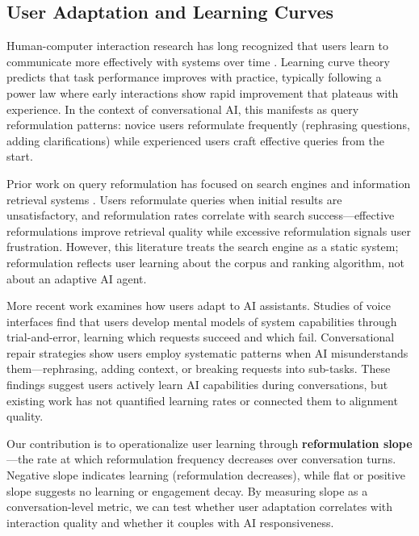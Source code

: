 \subsection{User Adaptation and Learning Curves}

Human-computer interaction research has long recognized that users learn to communicate more effectively with systems over time \cite{newell1981mechanisms}. Learning curve theory predicts that task performance improves with practice, typically following a power law where early interactions show rapid improvement that plateaus with experience. In the context of conversational AI, this manifests as query reformulation patterns: novice users reformulate frequently (rephrasing questions, adding clarifications) while experienced users craft effective queries from the start.

Prior work on query reformulation has focused on search engines and information retrieval systems \cite{huang2009query}. Users reformulate queries when initial results are unsatisfactory, and reformulation rates correlate with search success---effective reformulations improve retrieval quality while excessive reformulation signals user frustration. However, this literature treats the search engine as a static system; reformulation reflects user learning about the corpus and ranking algorithm, not about an adaptive AI agent.

More recent work examines how users adapt to AI assistants. Studies of voice interfaces \cite{luger2016like} find that users develop mental models of system capabilities through trial-and-error, learning which requests succeed and which fail. Conversational repair strategies \cite{ashktorab2019resilient} show users employ systematic patterns when AI misunderstands them---rephrasing, adding context, or breaking requests into sub-tasks. These findings suggest users actively learn AI capabilities during conversations, but existing work has not quantified learning rates or connected them to alignment quality.

Our contribution is to operationalize user learning through \textbf{reformulation slope}---the rate at which reformulation frequency decreases over conversation turns. Negative slope indicates learning (reformulation decreases), while flat or positive slope suggests no learning or engagement decay. By measuring slope as a conversation-level metric, we can test whether user adaptation correlates with interaction quality and whether it couples with AI responsiveness.

